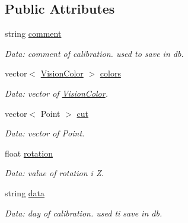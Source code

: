 \subsection*{Public Attributes}
\begin{DoxyCompactItemize}
\item 
string \hyperlink{structcommon_1_1Calibration_af7faad7cda5adfffefa44006cdecea85}{comment}\hypertarget{structcommon_1_1Calibration_af7faad7cda5adfffefa44006cdecea85}{}\label{structcommon_1_1Calibration_af7faad7cda5adfffefa44006cdecea85}

\begin{DoxyCompactList}\small\item\em Data\+: comment of calibration. used to save in db. \end{DoxyCompactList}\item 
vector$<$ \hyperlink{structcommon_1_1VisionColor}{Vision\+Color} $>$ \hyperlink{structcommon_1_1Calibration_a219ffe804bda864b9757bc5d32ee49c4}{colors}\hypertarget{structcommon_1_1Calibration_a219ffe804bda864b9757bc5d32ee49c4}{}\label{structcommon_1_1Calibration_a219ffe804bda864b9757bc5d32ee49c4}

\begin{DoxyCompactList}\small\item\em Data\+: vector of \hyperlink{structcommon_1_1VisionColor}{Vision\+Color}. \end{DoxyCompactList}\item 
vector$<$ Point $>$ \hyperlink{structcommon_1_1Calibration_adb64222af92367a220f889876324edbc}{cut}\hypertarget{structcommon_1_1Calibration_adb64222af92367a220f889876324edbc}{}\label{structcommon_1_1Calibration_adb64222af92367a220f889876324edbc}

\begin{DoxyCompactList}\small\item\em Data\+: vector of Point. \end{DoxyCompactList}\item 
float \hyperlink{structcommon_1_1Calibration_ac21ec0b2d7d746e86e6ccc68d3eb5b4f}{rotation}\hypertarget{structcommon_1_1Calibration_ac21ec0b2d7d746e86e6ccc68d3eb5b4f}{}\label{structcommon_1_1Calibration_ac21ec0b2d7d746e86e6ccc68d3eb5b4f}

\begin{DoxyCompactList}\small\item\em Data\+: value of rotation i Z. \end{DoxyCompactList}\item 
string \hyperlink{structcommon_1_1Calibration_abd3a75564db014e04bf2ee76512a3f0b}{data}\hypertarget{structcommon_1_1Calibration_abd3a75564db014e04bf2ee76512a3f0b}{}\label{structcommon_1_1Calibration_abd3a75564db014e04bf2ee76512a3f0b}

\begin{DoxyCompactList}\small\item\em Data\+: day of calibration. used ti save in db. \end{DoxyCompactList}\end{DoxyCompactItemize}


